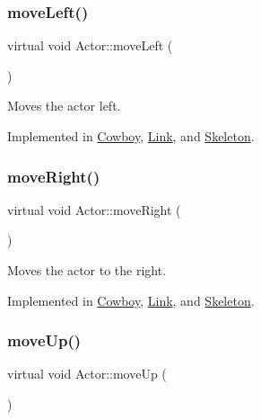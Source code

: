 \subsubsection{\texorpdfstring{moveLeft()}{moveLeft()}}
{\footnotesize\ttfamily virtual void Actor\+::move\+Left (\begin{DoxyParamCaption}{ }\end{DoxyParamCaption})\hspace{0.3cm}{\ttfamily [pure virtual]}}



Moves the actor left. 



Implemented in \mbox{\hyperlink{classCowboy_a487cf6b5d1e37586e6e9b408d2aaad1a}{Cowboy}}, \mbox{\hyperlink{classLink_a682bab2dc3f967e35a67dcc74c1d4722}{Link}}, and \mbox{\hyperlink{classSkeleton_ab03c65cdabc94f280443691653112d3a}{Skeleton}}.

\mbox{\label{classActor_a9176d8f8ec68fcbd91c48223e7c65775}} 
\subsubsection{\texorpdfstring{moveRight()}{moveRight()}}
{\footnotesize\ttfamily virtual void Actor\+::move\+Right (\begin{DoxyParamCaption}{ }\end{DoxyParamCaption})\hspace{0.3cm}{\ttfamily [pure virtual]}}



Moves the actor to the right. 



Implemented in \mbox{\hyperlink{classCowboy_a2094d31b2535a25ef8a40945473cf884}{Cowboy}}, \mbox{\hyperlink{classLink_aa1d60136a88be20a14179a5760ed91da}{Link}}, and \mbox{\hyperlink{classSkeleton_a3d8ce7b8a1d10e4a33a27f0eee54042e}{Skeleton}}.

\mbox{\label{classActor_afaa299f90233461ee4df96dcfda3008a}} 
\subsubsection{\texorpdfstring{moveUp()}{moveUp()}}
{\footnotesize\ttfamily virtual void Actor\+::move\+Up (\begin{DoxyParamCaption}{ }\end{DoxyParamCaption})\hspace{0.3cm}{\ttfamily [pure virtual]}}




